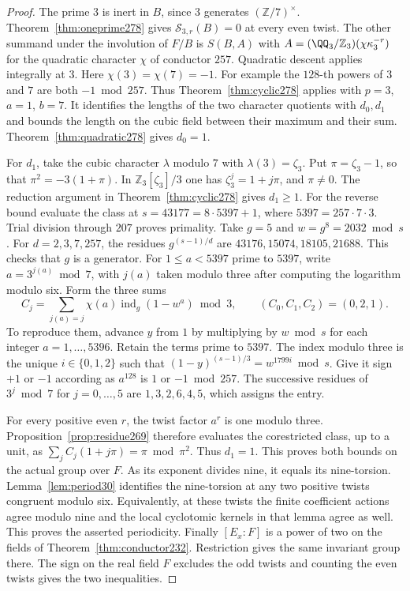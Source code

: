 \documentclass[a4paper,11pt]{article}
\theoremstyle{definition}
\theoremstyle{remark}
\newcommand{\ZZ}{\mathbb Z}\newcommand{\ord}{\operatorname{ord}}
\numberwithin{equation}{section}
\begin{document}
\begin{proof}
The prime \(3\) is inert in \(B\), since \(3\) generates
\((\ZZ/7)^\times\). Theorem~\ref{thm:oneprime278} gives
\(\mathcal S_{3,r}(B)=0\) at every even twist. The other summand
under the involution of \(F/B\) is \(S(B,A)\) with
\(A=(\QQ_3/\ZZ_3)(\chi\kappa_3^{-r})\) for the quadratic
character \(\chi\) of conductor \(257\). Quadratic descent
applies integrally at \(3\). Here \(\chi(3)=\chi(7)=-1\).
For example the \(128\)-th powers of \(3\) and \(7\) are both
\(-1\bmod257\). Thus Theorem~\ref{thm:cyclic278} applies with
\(p=3\), \(a=1\), \(b=7\). It identifies the lengths of the two
character quotients with \(d_0,d_1\) and bounds the length on
the cubic field between their maximum and their sum.
Theorem~\ref{thm:quadratic278} gives \(d_0=1\).

For \(d_1\), take the cubic character \(\lambda\) modulo \(7\)
with \(\lambda(3)=\zeta_3\). Put \(\pi=\zeta_3-1\), so that
\(\pi^2=-3(1+\pi)\). In \(\ZZ_3[\zeta_3]/3\) one has
\(\zeta_3^j=1+j\pi\), and \(\pi\ne0\). The reduction argument
in Theorem~\ref{thm:cyclic278} gives \(d_1\ge1\). For the
reverse bound evaluate the class at \(s=43177=8\cdot5397+1\),
where \(5397=257\cdot7\cdot3\). Trial division through \(207\)
proves primality. Take \(g=5\) and \(w=g^8=2032\bmod s\).
For \(d=2,3,7,257\), the residues \(g^{(s-1)/d}\) are
\(43176,15074,18105,21688\). This checks that \(g\) is a generator.
For \(1\le a<5397\) prime to \(5397\), write
\(a=3^{j(a)}\bmod7\), with \(j(a)\) taken modulo three after
computing the logarithm modulo six. Form the three sums
\[
 C_j=\sum_{j(a)=j}\chi(a)\operatorname{ind}_g(1-w^a)\bmod3,
                   \qquad (C_0,C_1,C_2)=(0,2,1).
\]
To reproduce them, advance \(y\) from \(1\) by multiplying by
\(w\bmod s\) for each integer \(a=1,\ldots,5396\). Retain the
terms prime to \(5397\). The index modulo three is the unique
\(i\in\{0,1,2\}\) such that
\((1-y)^{(s-1)/3}=w^{1799i}\bmod s\). Give it sign \(+1\) or
\(-1\) according as \(a^{128}\) is \(1\) or \(-1\bmod257\).
The successive residues of \(3^j\bmod7\) for
\(j=0,\ldots,5\) are \(1,3,2,6,4,5\), which assigns the entry.

For every positive even \(r\), the twist factor \(a^r\) is one
modulo three. Proposition~\ref{prop:residue269} therefore
evaluates the corestricted class, up to a unit, as
\(\sum_j C_j(1+j\pi)=\pi\bmod\pi^2\). Thus \(d_1=1\).
This proves both bounds on the actual group over \(F\).
As its exponent divides nine, it equals its nine-torsion.
Lemma~\ref{lem:period30} identifies the nine-torsion at any two
positive twists congruent modulo six. Equivalently, at these
twists the finite coefficient actions agree modulo nine and
the local cyclotomic kernels in that lemma agree as well.
This proves the asserted periodicity. Finally \([E_x:F]\) is
a power of two on the fields of Theorem~\ref{thm:conductor232}.
Restriction gives the same invariant group there. The sign on
the real field \(F\) excludes the odd twists and counting the
even twists gives the two inequalities.
\end{proof}
\end{document}
